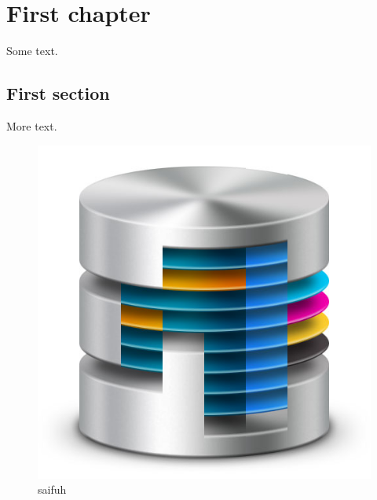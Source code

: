 

		\rhead{\today}

\lfoot{}			\cfoot{}				\rfoot{\thepage}


	
	
	
	\chapter{First chapter}
	Some text.
	
	\newpage
	
	\section{First section}
	More text.
	
	\begin{figure}[h]
		\centering
		\includegraphics[width=0.7\linewidth]{figs/titlepagefig}
		\caption[sidfuh]{saifuh}
		\label{fig:titlepagefig}
	\end{figure}
		

